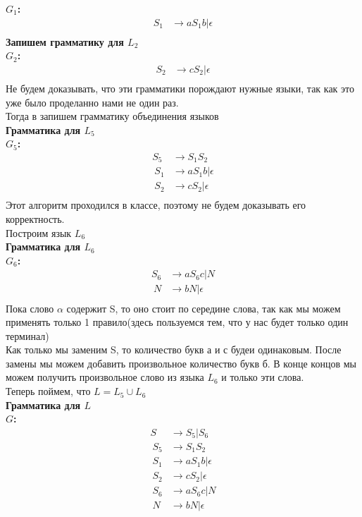 \documentclass[a4paper,12pt]{article}
\begin{document}
\textbf{$G_1$:}\\
\begin{align*}
	S_1&\to aS_1b|\epsilon\\\
\end{align*}
\textbf{Запишем грамматику для $L_2$}\\
\textbf{$G_2$:}\\
\begin{align*}
	S_2&\to cS_2|\epsilon\\\
\end{align*}
Не будем доказывать, что эти грамматики порождают нужные языки, так как это уже было проделанно нами не один раз.\\
Тогда в запишем грамматику объединения языков\\
\textbf{Грамматика для $L_5$}\\
\textbf{$G_5$:}\\
\begin{align*}
	S_5&\to S_1S_2\\\
	S_1&\to aS_1b|\epsilon\\\
	S_2&\to cS_2|\epsilon\\\
\end{align*}
Этот алгоритм проходился в классе, поэтому не будем доказывать его корректность.\\
Построим язык $L_6$\\
\textbf{Грамматика для $L_6$}\\
\textbf{$G_6$:}\\
\begin{align*}
	S_6&\to aS_6c|N\\\
	N&\to bN|\epsilon\\\
\end{align*}
Пока слово $\alpha$ содержит S, то оно стоит по середине слова, так как мы можем применять только 1 правило(здесь пользуемся тем, что у нас будет только один терминал)\\
Как только мы заменим S, то количество букв а и с будеи одинаковым. После замены мы можем добавить произвольное количество букв б. В конце концов мы можем получить произвольное слово из языка $L_6$ и только эти слова.\\
Теперь поймем, что $L=L_5 \cup L_6$\\
\textbf{Грамматика для $L$}\\
\textbf{$G$:}\\
\begin{align*}
	S&\to S_5|S_6\\\
	S_5&\to S_1S_2\\\
	S_1&\to aS_1b|\epsilon\\\
	S_2&\to cS_2|\epsilon\\\
	S_6&\to aS_6c|N\\\
	N&\to bN|\epsilon\\\
\end{align*}
\end{document}
